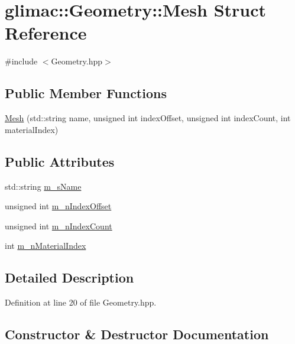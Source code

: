 \hypertarget{structglimac_1_1_geometry_1_1_mesh}{}\section{glimac\+:\+:Geometry\+:\+:Mesh Struct Reference}
\label{structglimac_1_1_geometry_1_1_mesh}


{\ttfamily \#include $<$Geometry.\+hpp$>$}

\subsection*{Public Member Functions}
\begin{DoxyCompactItemize}
\item 
\hyperlink{structglimac_1_1_geometry_1_1_mesh_ab1d9f7b63bf6a2f1f18e4122196fae17}{Mesh} (std\+::string name, unsigned int index\+Offset, unsigned int index\+Count, int material\+Index)
\end{DoxyCompactItemize}
\subsection*{Public Attributes}
\begin{DoxyCompactItemize}
\item 
std\+::string \hyperlink{structglimac_1_1_geometry_1_1_mesh_a46cc4ac1ecfdf763e2512c27a2155277}{m\+\_\+s\+Name}
\item 
unsigned int \hyperlink{structglimac_1_1_geometry_1_1_mesh_a896417ec0e07c46755564808948053eb}{m\+\_\+n\+Index\+Offset}
\item 
unsigned int \hyperlink{structglimac_1_1_geometry_1_1_mesh_a75519af4f04cd87eaea7bf091baaab07}{m\+\_\+n\+Index\+Count}
\item 
int \hyperlink{structglimac_1_1_geometry_1_1_mesh_a5ca9239ca2a5af322a87c259824557e8}{m\+\_\+n\+Material\+Index}
\end{DoxyCompactItemize}


\subsection{Detailed Description}


Definition at line 20 of file Geometry.\+hpp.



\subsection{Constructor \& Destructor Documentation}
\mbox{\label{structglimac_1_1_geometry_1_1_mesh_ab1d9f7b63bf6a2f1f18e4122196fae17}} 
